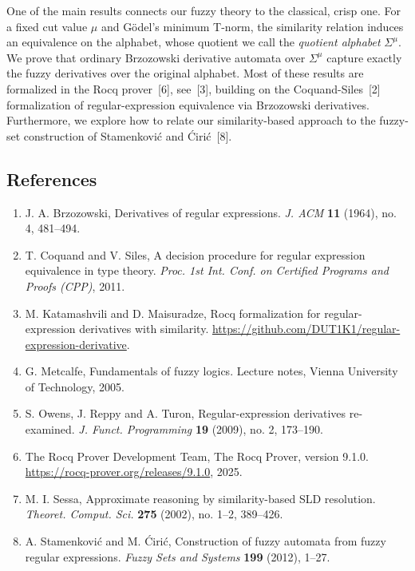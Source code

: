 \documentclass[11pt]{book}
\begin{document}
One of the main results connects our fuzzy theory to the classical, crisp one. For a
fixed cut value $\mu$ and G\"odel's minimum T-norm, the similarity relation induces an
equivalence on the alphabet, whose quotient we call the {\em quotient alphabet}
$\Sigma^\mu$. We prove that ordinary
Brzozowski derivative automata over $\Sigma^\mu$ capture exactly the fuzzy derivatives
over the original alphabet. Most of these results are formalized in the Rocq prover~[6], see~[3],
building on the Coquand-Siles~[2] formalization of regular-expression equivalence via
Brzozowski derivatives. Furthermore, we explore how to relate our similarity-based
approach to the fuzzy-set construction of Stamenkovi\'c and \'Ciri\'c~[8].

\subsection*{References}

\begin{enumerate}

\item[{[1]}] J. A. Brzozowski, Derivatives of regular expressions. \emph{J. ACM} \textbf{11} (1964), no. 4, 481--494.

\vspace{-7pt}
\item[{[2]}] T. Coquand and V. Siles, A decision procedure for regular expression equivalence in type theory. \emph{Proc. 1st Int. Conf. on Certified Programs and Proofs (CPP)}, 2011.

\vspace{-7pt}
\item[{[3]}] M. Katamashvili and D. Maisuradze, Rocq formalization for regular-expression derivatives with similarity. \url{https://github.com/DUT1K1/regular-expression-derivative}.

\vspace{-7pt}
\item[{[4]}] G. Metcalfe, Fundamentals of fuzzy logics. Lecture notes, Vienna University of Technology, 2005.

\vspace{-7pt}
\item[{[5]}] S. Owens, J. Reppy and A. Turon, Regular-expression derivatives re-examined. \emph{J. Funct. Programming} \textbf{19} (2009), no. 2, 173--190.

\vspace{-7pt}
\item[{[6]}] The Rocq Prover Development Team, The Rocq Prover, version 9.1.0. \url{https://rocq-prover.org/releases/9.1.0}, 2025.

\vspace{-7pt}
\item[{[7]}] M. I. Sessa, Approximate reasoning by similarity-based SLD resolution. \emph{Theoret. Comput. Sci.} \textbf{275} (2002), no. 1--2, 389--426.

\vspace{-7pt}
\item[{[8]}] A. Stamenkovi\'c and M. \'Ciri\'c, Construction of fuzzy automata from fuzzy regular expressions. \emph{Fuzzy Sets and Systems} \textbf{199} (2012), 1--27.
\end{enumerate}
\end{document}
